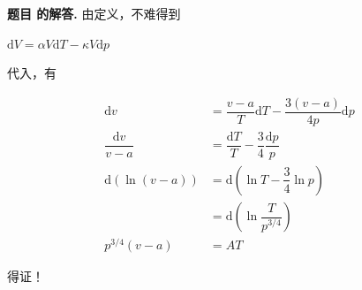 \documentclass[12pt, a4paper, oneside]{ctexart}
\newcounter{problemname}
\newenvironment{problem}
  {\begin{shaded}\stepcounter{problemname}\par\noindent\textbf{题目 \theproblemname. }}
  {\end{shaded}\par}
\newenvironment{solution}
  {\par\noindent\textbf{题目 \theproblemname 的解答. }}
  {\par}
\begin{document}
\begin{solution}
    由定义，不难得到

    \centerline{$\mathrm{d}V = \alpha V \mathrm{d}T - \kappa V \mathrm{d}p$}

    代入，有

    \begin{align*}
        \mathrm{d}v &= \dfrac{v-a}{T} \mathrm{d}T - \dfrac{3(v-a)}{4p} \mathrm{d}p \\
        \dfrac{\mathrm{d}v}{v-a} &= \dfrac{\mathrm{d}T}{T} - \dfrac{3}{4} \dfrac{\mathrm{d}p}{p} \\
        \mathrm{d}(\ln(v-a)) &= \mathrm{d}\left(\ln T - \dfrac{3}{4} \ln p\right)\\
        &= \mathrm{d}\left(\ln \dfrac{T}{p^{3/4}}\right)\\
        p^{3/4}(v-a) &= AT
    \end{align*}

    得证！
\end{solution}









\end{document}
